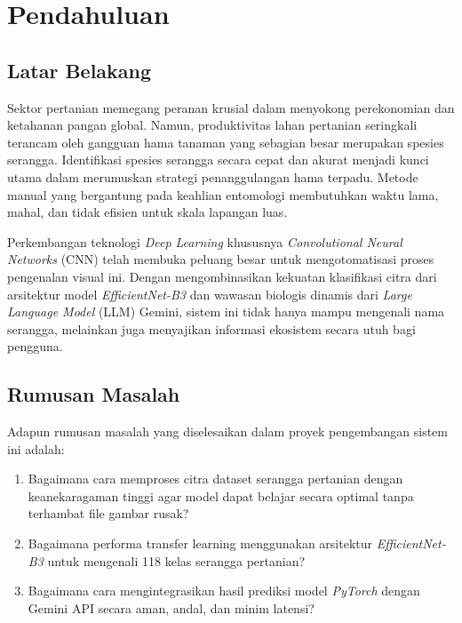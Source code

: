\documentclass[12pt, a4paper]{article}
\begin{document}
\newpage
\listoftables

\newpage
\section{Pendahuluan}

\subsection{Latar Belakang}
Sektor pertanian memegang peranan krusial dalam menyokong perekonomian dan ketahanan pangan global. Namun, produktivitas lahan pertanian seringkali terancam oleh gangguan hama tanaman yang sebagian besar merupakan spesies serangga. Identifikasi spesies serangga secara cepat dan akurat menjadi kunci utama dalam merumuskan strategi penanggulangan hama terpadu. Metode manual yang bergantung pada keahlian entomologi membutuhkan waktu lama, mahal, dan tidak efisien untuk skala lapangan luas. 

Perkembangan teknologi \textit{Deep Learning} khususnya \textit{Convolutional Neural Networks} (CNN) telah membuka peluang besar untuk mengotomatisasi proses pengenalan visual ini. Dengan mengombinasikan kekuatan klasifikasi citra dari arsitektur model \textit{EfficientNet-B3} dan wawasan biologis dinamis dari \textit{Large Language Model} (LLM) Gemini, sistem ini tidak hanya mampu mengenali nama serangga, melainkan juga menyajikan informasi ekosistem secara utuh bagi pengguna.

\subsection{Rumusan Masalah}
Adapun rumusan masalah yang diselesaikan dalam proyek pengembangan sistem ini adalah:
\begin{enumerate}
    \item Bagaimana cara memproses citra dataset serangga pertanian dengan keanekaragaman tinggi agar model dapat belajar secara optimal tanpa terhambat file gambar rusak?
    \item Bagaimana performa transfer learning menggunakan arsitektur \textit{EfficientNet-B3} untuk mengenali 118 kelas serangga pertanian?
    \item Bagaimana cara mengintegrasikan hasil prediksi model \textit{PyTorch} dengan Gemini API secara aman, andal, dan minim latensi?
\end{enumerate}
\end{document}
